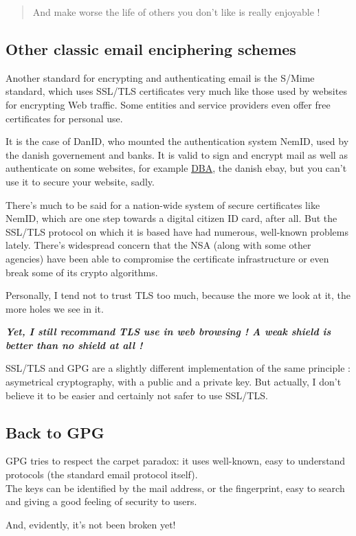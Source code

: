 \begin{quote}
And make worse the life of others you don't like is really enjoyable !
\end{quote}

\subsection{Other classic email enciphering schemes}\label{other-classic-email-enciphering-schemes}

Another standard for encrypting and authenticating email is the S/Mime
standard, which uses SSL/TLS certificates very much like those used by
websites for encrypting Web traffic. Some entities and service providers
even offer free certificates for personal use.

It is the case of DanID, who mounted the authentication system NemID,
used by the danish governement and banks. It is valid to sign and
encrypt mail as well as authenticate on some websites, for example
\href{http://www.dba.dk/}{DBA}, the danish ebay, but you can't use it to
secure your website, sadly.

There's much to be said for a nation-wide system of secure certificates
like NemID, which are one step towards a digital citizen ID card, after
all. But the SSL/TLS protocol on which it is based have had numerous,
well-known problems lately. There's widespread concern that the NSA
(along with some other agencies) have been able to compromise the
certificate infrastructure or even break some of its crypto algorithms.

Personally, I tend not to trust TLS too much, because the more we look
at it, the more holes we see in it.

\textbf{\emph{Yet, I still recommand TLS use in web browsing ! A weak
shield is better than no shield at all !}}

SSL/TLS and GPG are a slightly different implementation of the same
principle : asymetrical cryptography, with a public and a private key.
But actually, I don't believe it to be easier and certainly not safer to
use SSL/TLS.

\subsection{Back to GPG}\label{back-to-gpg}

GPG tries to respect the carpet paradox: it uses well-known, easy to
understand protocols (the standard email protocol itself).\\The keys can
be identified by the mail address, or the fingerprint, easy to search
and giving a good feeling of security to users.

And, evidently, it's not been broken yet!